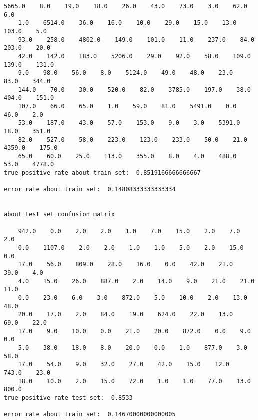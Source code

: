 \documentclass[11pt]{article}
\begin{document}
\begin{Verbatim}[commandchars=\\\{\}]
    5665.0    8.0    19.0    18.0    26.0    43.0    73.0    3.0    62.0    6.0
    1.0    6514.0    36.0    16.0    10.0    29.0    15.0    13.0    103.0    5.0
    93.0    258.0    4802.0    149.0    101.0    11.0    237.0    84.0    203.0    20.0
    42.0    142.0    183.0    5206.0    29.0    92.0    58.0    109.0    139.0    131.0
    9.0    98.0    56.0    8.0    5124.0    49.0    48.0    23.0    83.0    344.0
    144.0    70.0    30.0    520.0    82.0    3785.0    197.0    38.0    404.0    151.0
    107.0    66.0    65.0    1.0    59.0    81.0    5491.0    0.0    46.0    2.0
    53.0    187.0    43.0    57.0    153.0    9.0    3.0    5391.0    18.0    351.0
    82.0    527.0    58.0    223.0    123.0    233.0    50.0    21.0    4359.0    175.0
    65.0    60.0    25.0    113.0    355.0    8.0    4.0    488.0    53.0    4778.0
true positive rate about train set:  0.8519166666666667

error rate about train set:  0.14808333333333334


about test set confusion matrix

    942.0    0.0    2.0    2.0    1.0    7.0    15.0    2.0    7.0    2.0
    0.0    1107.0    2.0    2.0    1.0    1.0    5.0    2.0    15.0    0.0
    17.0    56.0    809.0    28.0    16.0    0.0    42.0    21.0    39.0    4.0
    4.0    15.0    26.0    887.0    2.0    14.0    9.0    21.0    21.0    11.0
    0.0    23.0    6.0    3.0    872.0    5.0    10.0    2.0    13.0    48.0
    20.0    17.0    2.0    84.0    19.0    624.0    22.0    13.0    69.0    22.0
    17.0    9.0    10.0    0.0    21.0    20.0    872.0    0.0    9.0    0.0
    5.0    38.0    18.0    8.0    20.0    0.0    1.0    877.0    3.0    58.0
    17.0    54.0    9.0    32.0    27.0    42.0    15.0    12.0    743.0    23.0
    18.0    10.0    2.0    15.0    72.0    1.0    1.0    77.0    13.0    800.0
true positive rate test set:  0.8533

error rate about train set:  0.14670000000000005

    \end{Verbatim}


    
    
    
    
\end{document}
